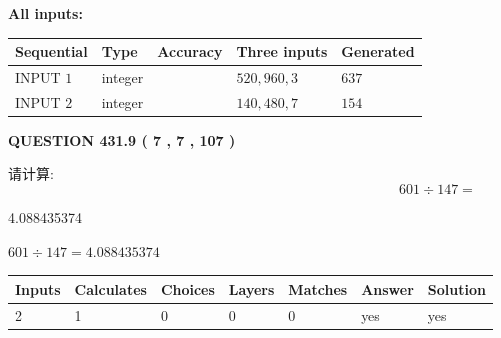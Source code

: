 \documentclass{ctexart}
\begin{document}
   
   
   
\noindent\vspace{0.1in}\hspace{-0.08in} {\textbf{\Large{All inputs: }}}
   
   
  
  
\noindent\begin{tabular}{|l|l|l|l|l|}
\hline
 Sequential & Type & Accuracy & Three inputs & Generated \\ 
\hline
 
 
  INPUT $  1 $ & integer &  & $
 520
 , 
 960
 , 
 3
 $ & $ 637 $ 
 \\  \hline  
 
 
  INPUT $  2 $ & integer &  & $
 140
 , 
 480
 , 
 7
 $ & $ 154 $ 
 \\  \hline  
 \end{tabular}
   
   
  
\vspace{0.2in}
  
{\textbf{\Large{QUESTION
431.9 
 ( 7 , 7 , 107 )
}}}
  
  
 
请计算:
\begin{equation}
601  \div    %
147 = \nonumber
\end{equation}
 
 
 
\noindent{}
 
 

4.088435374
 
 
\noindent{}
 
 

 
 
 
\noindent{}
 
 

$ %
601 \div  %
147=   %
4.088435374$
 
 
\noindent{}
 
 

 
   
   
   
   
\noindent\begin{tabular}{|l|l|l|l|l|l|l|}
 \hline
Inputs & Calculates & Choices & Layers & Matches & Answer & Solution \\ \hline
 2  & 
 1  & 
 0
  & 
 0  & 
 0  & 
  yes & 
  yes 
  \\ \hline
 \end{tabular}
   
\end{document}
